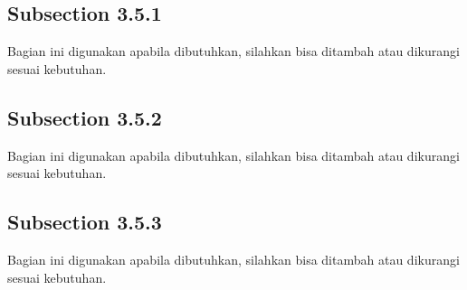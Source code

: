 \subsection{Subsection 3.5.1}
Bagian ini digunakan apabila dibutuhkan, silahkan bisa ditambah atau dikurangi sesuai kebutuhan.

\subsection{Subsection 3.5.2}
Bagian ini digunakan apabila dibutuhkan, silahkan bisa ditambah atau dikurangi sesuai kebutuhan.

\subsection{Subsection 3.5.3}
Bagian ini digunakan apabila dibutuhkan, silahkan bisa ditambah atau dikurangi sesuai kebutuhan.